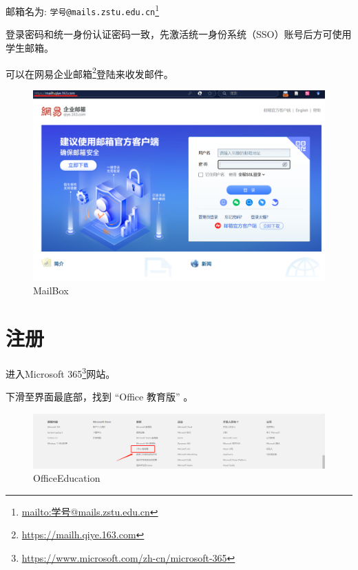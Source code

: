 \documentclass[]{ctexbook}
\renewcommand{\href}[2]{#2\footnote{\url{#1}}}
\theoremstyle{definition}
\theoremstyle{definition}
\theoremstyle{definition}
\theoremstyle{definition}
\theoremstyle{remark}
\begin{document}
邮箱名为: \href{mailto:学号@mails.zstu.edu.cn}{\nolinkurl{学号@mails.zstu.edu.cn}}

登录密码和统一身份认证密码一致，先激活统一身份系统（SSO）账号后方可使用学生邮箱。

可以在\href{https://mailh.qiye.163.com}{网易企业邮箱}登陆来收发邮件。

\begin{figure}

{\centering \includegraphics[width=1\linewidth]{img/OneDrive/MailBox} 

}

\caption{MailBox}\label{fig:OneDrive-MailBox}
\end{figure}

\section{注册}\label{ux6ce8ux518c}

进入\href{https://www.microsoft.com/zh-cn/microsoft-365}{Microsoft 365}网站。

下滑至界面最底部，找到 ``Office 教育版'' 。

\begin{figure}

{\centering \includegraphics[width=1\linewidth]{img/OneDrive/Office_Education} 

}

\caption{OfficeEducation}\label{fig:OneDrive-OfficeEducation}
\end{figure}
\end{document}
